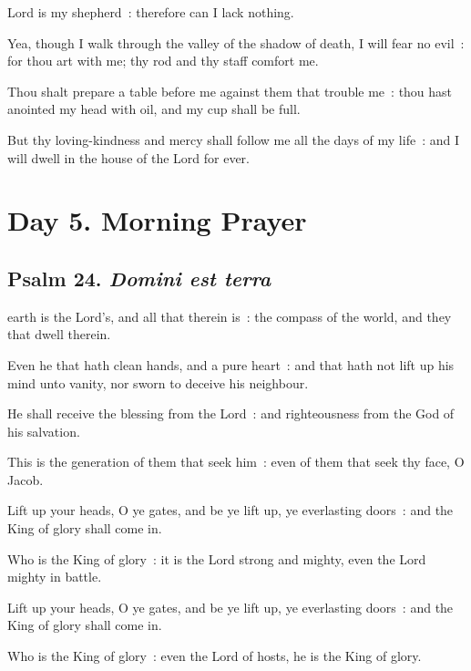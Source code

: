  Lord is my shepherd~: therefore can I lack nothing.\par
{}
Yea, though I walk through the valley of the shadow of death, I will fear no evil~: for thou art with me; thy rod and thy staff comfort me.\par
{}Thou shalt prepare a table before me against them that trouble me~: thou hast anointed my head with oil, and my cup shall be full.\par
{}But thy loving-kindness and mercy shall follow me all the days of my life~: and I will dwell in the house of the Lord for ever.\par

\section*{Day 5. Morning Prayer}

\subsection{Psalm 24. \textit{Domini est terra}}


 earth is the Lord's, and all that therein is~: the compass of the world, and they that dwell therein.\par
{}
Even he that hath clean hands, and a pure heart~: and that hath not lift up his mind unto vanity, nor sworn to deceive his neighbour.\par
{}He shall receive the blessing from the Lord~: and righteousness from the God of his salvation.\par
{}This is the generation of them that seek him~: even of them that seek thy face, O Jacob.\par
{}Lift up your heads, O ye gates, and be ye lift up, ye everlasting doors~: and the King of glory shall come in.\par
{}Who is the King of glory~: it is the Lord strong and mighty, even the Lord mighty in battle.\par
{}Lift up your heads, O ye gates, and be ye lift up, ye everlasting doors~: and the King of glory shall come in.\par
{}Who is the King of glory~: even the Lord of hosts, he is the King of glory.\par

